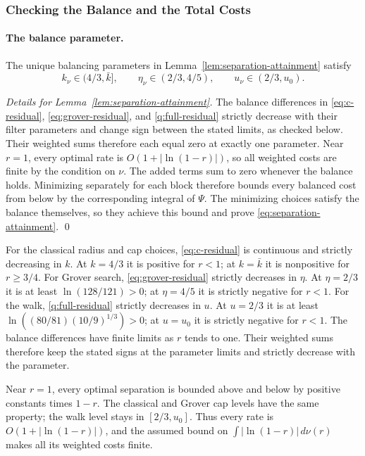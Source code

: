 \documentclass[runningheads,envcountsame,envcountsect,orivec]{llncs}
\begin{document}
\subsubsection{Checking the Balance and the Total Costs}

\paragraph{The balance parameter.}
\label{app:balanced-minima-details}
The unique balancing parameters in Lemma~\ref{lem:separation-attainment}
satisfy
\[
 k_\nu\in(4/3,\bar k],\qquad
 \eta_\nu\in(2/3,4/5),\qquad
 u_\nu\in(2/3,u_0).
\]
\begin{proof}[Details for Lemma~\ref{lem:separation-attainment}]
The balance differences in \eqref{eq:c-residual},
\eqref{eq:grover-residual}, and \eqref{q:full-residual}
strictly decrease with their filter parameters and change sign
between the stated limits, as checked below. Their weighted sums
therefore each equal zero at exactly one parameter. Near $r=1$,
every optimal rate is $O(1+|\ln(1-r)|)$, so all weighted costs
are finite by the condition on $\nu$.
The added terms sum to zero whenever the balance holds.
Minimizing separately for each block therefore bounds every
balanced cost from below by the corresponding integral of
$\Psi$. The minimizing choices satisfy the balance themselves,
so they achieve this bound and prove
\eqref{eq:separation-attainment}.
\qed
\end{proof}



For the classical radius and cap choices, \eqref{eq:c-residual} is continuous
and strictly decreasing in $k$. At $k=4/3$ it is positive for
$r<1$; at $k=\bar k$ it is nonpositive for $r\ge3/4$.
For Grover search, \eqref{eq:grover-residual} strictly decreases
in $\eta$. At $\eta=2/3$ it is at least $\ln(128/121)>0$;
at $\eta=4/5$ it is strictly negative for $r<1$.
For the walk, \eqref{q:full-residual} strictly decreases in $u$.
At $u=2/3$ it is at least
$\ln((80/81)(10/9)^{1/3})>0$; at $u=u_0$ it is strictly
negative for $r<1$. The balance differences have finite limits as $r$ tends to one.
Their weighted sums therefore keep the stated signs at the
parameter limits and strictly decrease with the parameter.

Near $r=1$, every optimal separation is bounded above and below
by positive constants times $1-r$. The classical and Grover cap
levels have the same property; the walk level stays in
$[2/3,u_0]$. Thus every rate is $O(1+|\ln(1-r)|)$, and the
assumed bound on $\int|\ln(1-r)|\,d\nu(r)$ makes all its weighted
costs finite.
\end{document}
